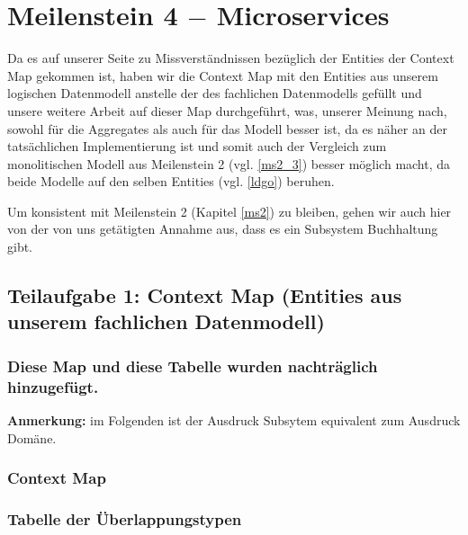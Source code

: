 \section{Meilenstein 4 $-$ Microservices}

Da es auf unserer Seite zu Missverst\"andnissen bez\"uglich
der Entities der Context Map gekommen ist, haben wir die
Context Map mit den Entities aus unserem logischen
Datenmodell anstelle der des fachlichen Datenmodells
gef\"ullt und unsere weitere Arbeit auf dieser
Map durchgef\"uhrt, was, unserer Meinung nach, sowohl f\"ur
die Aggregates als auch f\"ur das Modell besser ist, da es
n\"aher an der tats\"achlichen Implementierung ist und
somit auch der Vergleich zum monolitischen Modell aus
Meilenstein 2 (vgl. \ref{ms2_3}) besser m\"oglich macht, da
beide Modelle auf den selben Entities (vgl. \ref{ldgo})
beruhen.

Um konsistent mit Meilenstein 2 (Kapitel \ref{ms2}) zu
bleiben, gehen wir auch hier von der von uns get\"atigten
Annahme aus, dass es ein Subsystem Buchhaltung gibt.

\subsection{Teilaufgabe 1: Context Map (Entities aus
  unserem fachlichen Datenmodell)}

\subsubsection*{Diese Map und diese Tabelle wurden
  nachtr\"aglich hinzugef\"ugt.}

\textbf{Anmerkung:} im Folgenden ist der Ausdruck Subsytem
equivalent zum Ausdruck Dom\"ane.

\subsubsection{Context Map}


\subsubsection{Tabelle der \"Uberlappungstypen}

